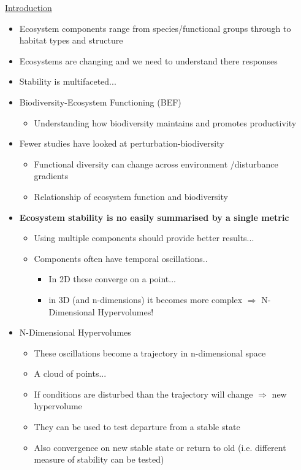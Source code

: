 \documentclass[11pt]{article}
\begin{document}
	\underline{Introduction}
	\begin{itemize}
		\item Ecosystem components range from species/functional groups through to habitat types and structure
		\item Ecosystems are changing and we need to understand there responses
		\item Stability is multifaceted...
		\item Biodiversity-Ecosystem Functioning (BEF)
		\begin{itemize}
			\item Understanding how biodiversity maintains and promotes productivity
		\end{itemize}
		\item Fewer studies have looked at perturbation-biodiversity
		\begin{itemize}
			\item Functional diversity can change across environment /disturbance gradients
			\item Relationship of ecosystem function and biodiversity
		\end{itemize}
		\item \textbf{Ecosystem stability is no easily summarised by a single metric}
		\begin{itemize}
			\item Using multiple components should provide better results...
			\item Components often have temporal oscillations..
			\begin{itemize}
				\item In 2D these converge on a point...
				\item in 3D (and n-dimensions) it becomes more complex $\Rightarrow$ N-Dimensional Hypervolumes!
			\end{itemize}
		\end{itemize}
		\item N-Dimensional Hypervolumes
	\begin{itemize}
		\item These oscillations become a trajectory in n-dimensional space
		\item A cloud of points...
		\item If conditions are disturbed than the trajectory will change $\Rightarrow$ new hypervolume
		\item They can be used to test departure from a stable state
		\item Also convergence on new stable state or return to old (i.e. different measure of stability can be tested)

\end{itemize}
\end{itemize}
\end{document}
